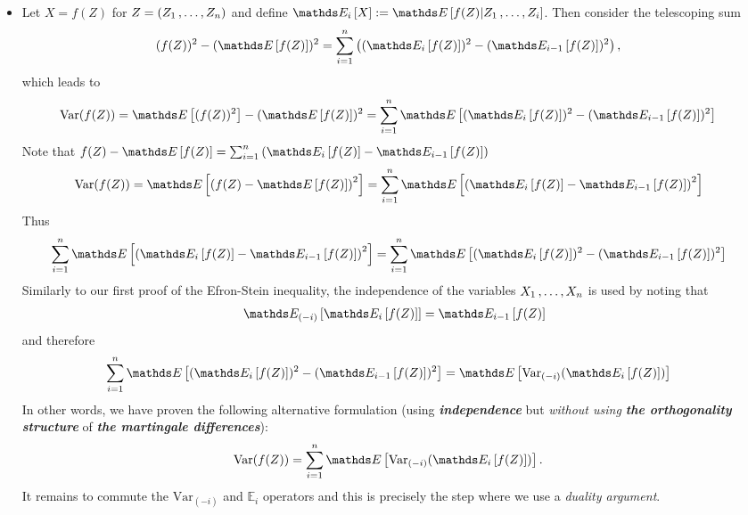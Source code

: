 \documentclass[11pt]{article}
\begin{document}
\begin{itemize}
\item \begin{remark}
Let $X = f(Z)$ for $Z= (Z_1 \,{,}\ldots{,}\, Z_n)$ and define $\E{i}{X} := \E{}{f(Z) | Z_1 \xdotx{,} Z_i}$. Then consider the telescoping sum
\begin{align*}
(f(Z))^2 - (\E{}{f(Z)})^2 &= \sum_{i=1}^{n}\paren{(\E{i}{f(Z)})^2 - (\E{i-1}{f(Z)})^2},
\end{align*} which leads to
\begin{align*}
\text{Var}(f(Z)) = \E{}{(f(Z))^2} - (\E{}{f(Z)})^2 &=  \sum_{i=1}^{n}\E{}{(\E{i}{f(Z)})^2 - (\E{i-1}{f(Z)})^2}
\end{align*} Note that $f(Z) - \E{}{f(Z)} = \sum_{i=1}^{n}\paren{\E{i}{f(Z)} - \E{i-1}{f(Z)}}$
\begin{align*}
\text{Var}(f(Z)) = \E{}{\paren{f(Z) - \E{}{f(Z)}}^2} &=   \sum_{i=1}^{n}\E{}{\paren{\E{i}{f(Z)} - \E{i-1}{f(Z)}}^2}
\end{align*} Thus
\begin{align*}
\sum_{i=1}^{n}\E{}{\paren{\E{i}{f(Z)} - \E{i-1}{f(Z)}}^2} &=  \sum_{i=1}^{n}\E{}{(\E{i}{f(Z)})^2 - (\E{i-1}{f(Z)})^2}
\end{align*} Similarly to our first proof of the Efron-Stein inequality, the independence of the variables $X_1 \,{,}\ldots{,}\, X_n$ is used by noting that
\begin{align*}
\E{(-i)}{\E{i}{f(Z)}} = \E{i-1}{f(Z)}
\end{align*} and therefore
\begin{align*}
\sum_{i=1}^{n}\E{}{(\E{i}{f(Z)})^2 - (\E{i-1}{f(Z)})^2} &= \E{}{\text{Var}_{(-i)}(\E{i}{f(Z)})}
\end{align*} In other words, we have proven the following alternative formulation (using \emph{\textbf{independence}} but \emph{without using \textbf{the orthogonality structure}} of \emph{\textbf{the martingale differences}}):
\begin{align}
\text{Var}(f(Z)) &=  \sum_{i=1}^{n} \E{}{\text{Var}_{(-i)}(\E{i}{f(Z)})}.  \label{eqn: variational_variance_conditional_exp}
\end{align} It remains to commute the $\text{Var}_{(-i)}$ and $\mathds{E}_i$ operators and this is precisely the step where we use a \emph{duality argument}.
\end{remark}


\end{itemize}
\end{document}
